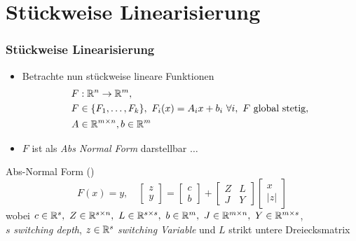 \section[Stückweise Linearisierung]{Stückweise Linearisierung}
\begin{frame}[<+->]
\frametitle{Stückweise Linearisierung}
\begin{itemize}
\item Betrachte nun stückweise lineare Funktionen 
\[
\begin{aligned}
 F&:\mathbb R^n \to \mathbb R^m, \\
 F&\in \lbrace F_1,\ldots,F_k\rbrace,~F_i(x)=A_ix+b_i~\forall i,~F\text{ global stetig}, \\
 A&\in\mathbb R^{m\times n},b\in\mathbb R^m
 \end{aligned}
\]
 \item $F$ ist als \textit{Abs Normal Form} darstellbar $\ldots$
 \end{itemize}
\begin{block}{Abs-Normal Form (\cite{plan})}
 \begin{equation}
\label{eq:absNormalForm}
F(x) = y,\quad 
  \begin{bmatrix}
   z\\y
  \end{bmatrix}
  =
  \begin{bmatrix}
   c\\b
  \end{bmatrix}
  +
  \begin{bmatrix}
   Z & L\\
   J & Y
  \end{bmatrix}
  \begin{bmatrix}
   x\\|z|
  \end{bmatrix}
 \end{equation}
wobei $c\in \mathbb R^s, ~ Z\in \mathbb R^{s\times n},~ L\in\mathbb R^{s\times s}, ~ b\in\mathbb R^m, ~ J\in\mathbb R^{m\times n}, ~ Y\in \mathbb R^{m\times s}$,\\
$s$ \textit{switching depth}, $z\in \mathbb R^s$ \textit{switching Variable} und $L$ strikt untere Dreiecksmatrix
\end{block}
\end{frame}

